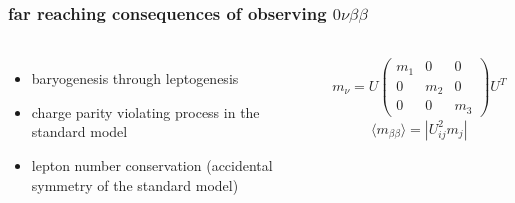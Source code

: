 \documentclass{beamer}
\begin{document}
	\begin{frame}
		\frametitle{far reaching consequences of observing $0\nu\beta\beta$}
		\begin{columns}[c] %
			
			\begin{itemize}
				\setlength\itemsep{2em}
				\item baryogenesis through leptogenesis
				\item charge parity violating process in the standard model
				\item lepton number conservation (accidental symmetry of the standard model)
			\end{itemize}
			
			\begin{gather*}
			m_{\nu} = U 
			\begin{pmatrix} m_1 & 0 & 0 \\
							0 & m_2 & 0 \\
							0 & 0 & m_3
			\end{pmatrix}
			U^{T}
			\end{gather*} 
			\begin{equation*}
			\langle m_{\beta\beta}\rangle = |U_{ij}^2 m_j|
			\end{equation*}
			
		\end{columns}
	\end{frame}	
	
	
	
	
	
\end{document}
